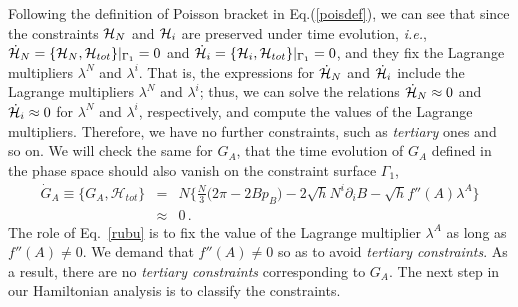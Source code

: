 \documentclass[a4paper,12pt]{article}
\newcommand{\la}{\lambda}
\newcommand{\Ga}{\Gamma}
\newcommand{\cH}{{\cal H}}
\newcommand{\+}{^{\dagger}}
\newcommand{\2}{\frac{1}{2}}
\newcommand{\3}{\frac{1}{3}}
\newcommand{\4}{\frac{1}{4}}
\newcommand{\6}{\frac{1}{6}}
\newcommand{\8}{\frac{1}{8}}
\newcommand{\non}{\nonumber\\}
\begin{document}
Following the definition of Poisson bracket in Eq.(\ref{poisdef}), we can see that since the constraints $\cH_N$ and $\cH_i$ are preserved under time evolution, \textit{i.e.}, $\dot \cH_N=\{\cH_N,\mathcal{H}_{tot}\}|_{\Ga_1}= 0$ and $\dot \cH_i=\{\cH_i,\mathcal{H}_{tot}\}|_{\Ga_1}= 0$, and they fix the Lagrange multipliers $\la^N$ and $\la^i$. That is, the expressions for $\dot \cH_N$ and $\dot \cH_i$ include the Lagrange multipliers $\la^N$ and $\la^i$; thus, we can solve the relations $\dot \cH_N \approx 0$ and $\dot \cH_i \approx 0$ for $\la^N$ and $\la^i$, respectively, and compute the values of the Lagrange multipliers. Therefore, we have no further constraints, such as {\it tertiary} ones and so on. 
We will check the same for $G_A$, that the time evolution of $G_A$ defined in the phase space should also vanish on the constraint surface $\Ga_1$,
\begin{eqnarray} \label{rubu}
\dot G_A\equiv\{G_{A},\mathcal{H}_{tot}\}
&=& N\Bigg\{\frac{N}{3}\Big(2\pi-2Bp_B\Big)-2\sqrt{h}N^i\partial_iB-\sqrt{h}f''(A)\lambda^{A}\Bigg\} \non
&\approx&0 \,.
\end{eqnarray}
The role of Eq.~\eqref{rubu} is to fix the value of the Lagrange multiplier $\lambda^{A}$ as long as $f''(A)\neq0$. We demand that $f''(A) \neq 0$ so as to avoid \textit{tertiary constraints}. As a result, there are no {\it tertiary constraints} corresponding to $G_A$. The next step in our Hamiltonian analysis is to classify the constraints. 

\end{document}
